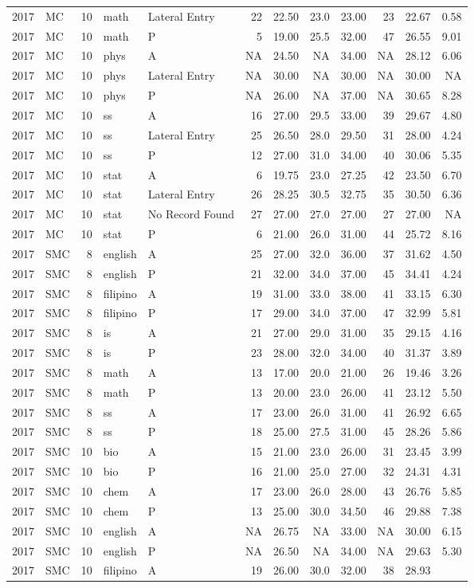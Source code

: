\documentclass[]{article}
\begin{document}
\begin{longtable}[]{@{}rlrllrrrrrrr@{}}
2017 & MC & 10 & math & Lateral Entry & 22 & 22.50 & 23.0 & 23.00 & 23 &
22.67 & 0.58\tabularnewline
2017 & MC & 10 & math & P & 5 & 19.00 & 25.5 & 32.00 & 47 & 26.55 &
9.01\tabularnewline
2017 & MC & 10 & phys & A & NA & 24.50 & NA & 34.00 & NA & 28.12 &
6.06\tabularnewline
2017 & MC & 10 & phys & Lateral Entry & NA & 30.00 & NA & 30.00 & NA &
30.00 & NA\tabularnewline
2017 & MC & 10 & phys & P & NA & 26.00 & NA & 37.00 & NA & 30.65 &
8.28\tabularnewline
2017 & MC & 10 & ss & A & 16 & 27.00 & 29.5 & 33.00 & 39 & 29.67 &
4.80\tabularnewline
2017 & MC & 10 & ss & Lateral Entry & 25 & 26.50 & 28.0 & 29.50 & 31 &
28.00 & 4.24\tabularnewline
2017 & MC & 10 & ss & P & 12 & 27.00 & 31.0 & 34.00 & 40 & 30.06 &
5.35\tabularnewline
2017 & MC & 10 & stat & A & 6 & 19.75 & 23.0 & 27.25 & 42 & 23.50 &
6.70\tabularnewline
2017 & MC & 10 & stat & Lateral Entry & 26 & 28.25 & 30.5 & 32.75 & 35 &
30.50 & 6.36\tabularnewline
2017 & MC & 10 & stat & No Record Found & 27 & 27.00 & 27.0 & 27.00 & 27
& 27.00 & NA\tabularnewline
2017 & MC & 10 & stat & P & 6 & 21.00 & 26.0 & 31.00 & 44 & 25.72 &
8.16\tabularnewline
2017 & SMC & 8 & english & A & 25 & 27.00 & 32.0 & 36.00 & 37 & 31.62 &
4.50\tabularnewline
2017 & SMC & 8 & english & P & 21 & 32.00 & 34.0 & 37.00 & 45 & 34.41 &
4.24\tabularnewline
2017 & SMC & 8 & filipino & A & 19 & 31.00 & 33.0 & 38.00 & 41 & 33.15 &
6.30\tabularnewline
2017 & SMC & 8 & filipino & P & 17 & 29.00 & 34.0 & 37.00 & 47 & 32.99 &
5.81\tabularnewline
2017 & SMC & 8 & is & A & 21 & 27.00 & 29.0 & 31.00 & 35 & 29.15 &
4.16\tabularnewline
2017 & SMC & 8 & is & P & 23 & 28.00 & 32.0 & 34.00 & 40 & 31.37 &
3.89\tabularnewline
2017 & SMC & 8 & math & A & 13 & 17.00 & 20.0 & 21.00 & 26 & 19.46 &
3.26\tabularnewline
2017 & SMC & 8 & math & P & 13 & 20.00 & 23.0 & 26.00 & 41 & 23.12 &
5.50\tabularnewline
2017 & SMC & 8 & ss & A & 17 & 23.00 & 26.0 & 31.00 & 41 & 26.92 &
6.65\tabularnewline
2017 & SMC & 8 & ss & P & 18 & 25.00 & 27.5 & 31.00 & 45 & 28.26 &
5.86\tabularnewline
2017 & SMC & 10 & bio & A & 15 & 21.00 & 23.0 & 26.00 & 31 & 23.45 &
3.99\tabularnewline
2017 & SMC & 10 & bio & P & 16 & 21.00 & 25.0 & 27.00 & 32 & 24.31 &
4.31\tabularnewline
2017 & SMC & 10 & chem & A & 17 & 23.00 & 26.0 & 28.00 & 43 & 26.76 &
5.85\tabularnewline
2017 & SMC & 10 & chem & P & 13 & 25.00 & 30.0 & 34.50 & 46 & 29.88 &
7.38\tabularnewline
2017 & SMC & 10 & english & A & NA & 26.75 & NA & 33.00 & NA & 30.00 &
6.15\tabularnewline
2017 & SMC & 10 & english & P & NA & 26.50 & NA & 34.00 & NA & 29.63 &
5.30\tabularnewline
2017 & SMC & 10 & filipino & A & 19 & 26.00 & 30.0 & 32.00 & 38 & 28.93

\end{longtable}
\end{document}
